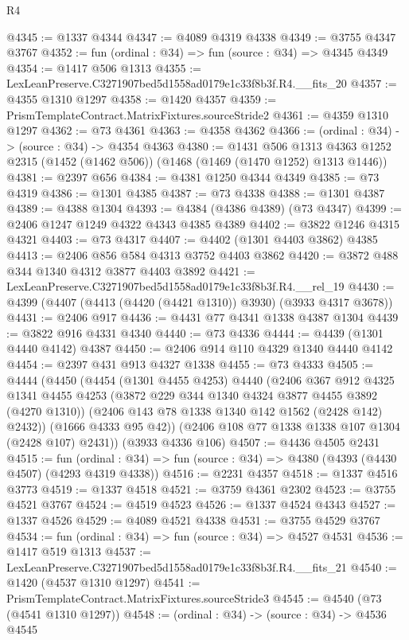 \begin{lexlean}{R4}
\begin{coremodule}
@4345 := @1337 @4344
@4347 := @4089 @4319 @4338
@4349 := @3755 @4347 @3767
@4352 := fun (ordinal : @34) => fun (source : @34) => @4345 @4349
@4354 := @1417 @506 @1313
@4355 := LexLeanPreserve.C3271907bed5d1558ad0179e1c33f8b3f.R4.__fits_20
@4357 := @4355 @1310 @1297
@4358 := @1420 @4357
@4359 := PrismTemplateContract.MatrixFixtures.sourceStride2
@4361 := @4359 @1310 @1297
@4362 := @73 @4361
@4363 := @4358 @4362
@4366 := (ordinal : @34) -> (source : @34) -> @4354 @4363
@4380 := @1431
    @506
    @1313
    @4363
    @1252
    @2315
    (@1452 (@1462 @506))
    (@1468 (@1469 (@1470 @1252) @1313 @1446))
@4381 := @2397 @656
@4384 := @4381 @1250 @4344 @4349
@4385 := @73 @4319
@4386 := @1301 @4385
@4387 := @73 @4338
@4388 := @1301 @4387
@4389 := @4388 @1304
@4393 := @4384 (@4386 @4389) (@73 @4347)
@4399 := @2406 @1247 @1249 @4322 @4343 @4385 @4389
@4402 := @3822 @1246 @4315 @4321
@4403 := @73 @4317
@4407 := @4402 (@1301 @4403 @3862) @4385
@4413 := @2406 @856 @584 @4313 @3752 @4403 @3862
@4420 := @3872 @488 @344 @1340 @4312 @3877 @4403 @3892
@4421 := LexLeanPreserve.C3271907bed5d1558ad0179e1c33f8b3f.R4.__rel_19
@4430 := @4399 (@4407 (@4413 (@4420 (@4421 @1310)) @3930) (@3933 @4317 @3678))
@4431 := @2406 @917
@4436 := @4431 @77 @4341 @1338 @4387 @1304
@4439 := @3822 @916 @4331 @4340
@4440 := @73 @4336
@4444 := @4439 (@1301 @4440 @4142) @4387
@4450 := @2406 @914 @110 @4329 @1340 @4440 @4142
@4454 := @2397 @431 @913 @4327 @1338
@4455 := @73 @4333
@4505 := @4444
    (@4450
      (@4454
        (@1301 @4455 @4253)
        @4440
        (@2406
          @367
          @912
          @4325
          @1341
          @4455
          @4253
          (@3872 @229 @344 @1340 @4324 @3877 @4455 @3892 (@4270 @1310))
          (@2406 @143 @78 @1338 @1340 @142 @1562 (@2428 @142) @2432))
        (@1666 @4333 @95 @42))
      (@2406 @108 @77 @1338 @1338 @107 @1304 (@2428 @107) @2431))
    (@3933 @4336 @106)
@4507 := @4436 @4505 @2431
@4515 := fun (ordinal : @34) =>
  fun (source : @34) => @4380 (@4393 (@4430 @4507) (@4293 @4319 @4338))
@4516 := @2231 @4357
@4518 := @1337 @4516 @3773
@4519 := @1337 @4518
@4521 := @3759 @4361 @2302
@4523 := @3755 @4521 @3767
@4524 := @4519 @4523
@4526 := @1337 @4524 @4343
@4527 := @1337 @4526
@4529 := @4089 @4521 @4338
@4531 := @3755 @4529 @3767
@4534 := fun (ordinal : @34) => fun (source : @34) => @4527 @4531
@4536 := @1417 @519 @1313
@4537 := LexLeanPreserve.C3271907bed5d1558ad0179e1c33f8b3f.R4.__fits_21
@4540 := @1420 (@4537 @1310 @1297)
@4541 := PrismTemplateContract.MatrixFixtures.sourceStride3
@4545 := @4540 (@73 (@4541 @1310 @1297))
@4548 := (ordinal : @34) -> (source : @34) -> @4536 @4545

\end{coremodule}
\end{lexlean}
